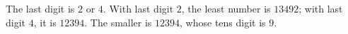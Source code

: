 The last digit is $2$ or $4$. With last digit $2$, the least number is $13492$; with last digit $4$, it is $12394$. The smaller is $12394$, whose tens digit is $\boxed9$.
